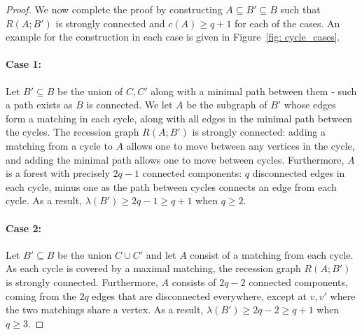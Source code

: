 \documentclass[11pt]{article}
\theoremstyle{definition}
\numberwithin{equation}{section}
\newcommand{\bddgraph}[2]{R(#1;#2)}
\begin{document}
\begin{proof}
We now complete the proof by constructing $A \subseteq B' \subseteq B$ such that $\bddgraph{A}{B'}$ is strongly connected and $c(A) \geq q+1$ for each of the cases.
An example for the construction in each case is given in Figure~\ref{fig: cycle_cases}.

\paragraph{\bf Case 1:}
Let $B' \subseteq B$ be the union of $C, C'$ along with a minimal path between them - such a path exists as $B$ is connected.
We let $A$ be the subgraph of $B'$ whose edges form a matching in each cycle, along with all edges in the minimal path between the cycles.
The recession graph $\bddgraph{A}{B'}$ is strongly connected: adding a matching from a cycle to $A$ allows one to move between any vertices in the cycle, and adding the minimal path allows one to move between cycles.
Furthermore, $A$ is a forest with precisely $2q-1$ connected components: $q$ disconnected edges in each cycle, minus one as the path between cycles connects an edge from each cycle.
As a result, $\lambda(B') \geq 2q -1 \geq q+1$ when $q \geq 2$. 

\paragraph{\bf Case 2:}
Let $B' \subseteq B$ be the union $C \cup C'$ and let $A$ consist of a matching from each cycle.
As each cycle is covered by a maximal matching, the recession graph $\bddgraph{A}{B'}$ is strongly connected.
Furthermore, $A$ consists of $2q-2$ connected components, coming from the $2q$ edges that are disconnected everywhere, except at $v,v'$ where the two matchings share a vertex.
As a result, $\lambda(B') \geq 2q -2 \geq q+1$ when $q \geq 3$. 


\end{proof}
\end{document}
